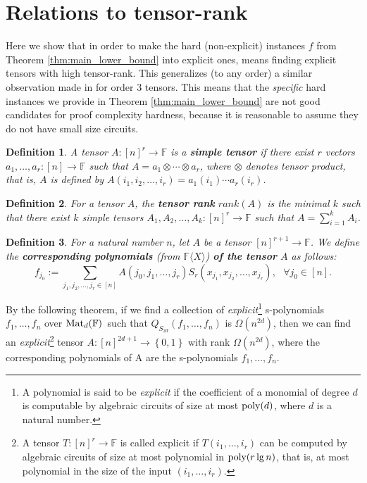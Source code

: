 \documentclass[12pt,reqno]{article}
\newtheorem{definition}{Definition}
\newcommand\F{\ensuremath{\mathbb F}}
\newcommand{\poly}{\hbox{poly}}
\newcommand{\matd}{{\ensuremath{{\rm Mat}_d(\F)}}}
\newcommand{\freea}{\ensuremath{\F\langle X\rangle}}
\newcommand{\set}[1]{\left\{#1\right\}}
\newcommand{\nx}[1]{#1_1,\ldots,#1_{n}}
\begin{document}
\section{Relations to tensor-rank }
Here we show that in order to make the hard (non-explicit) instances
$f$ from Theorem \ref{thm:main_lower_bound} into explicit ones, means finding explicit tensors with high tensor-rank.
This generalizes (to any order) a similar observation made in \cite{Hru11} for order 3 tensors. This means that the\textit{ specific} hard instances we provide in Theorem \ref{thm:main_lower_bound} are not good candidates for proof complexity hardness, because it is reasonable to assume they do not have small size circuits.


\begin{definition}
A  tensor $A : [n]^r\to \F$ is a \textbf{\textit{simple tensor }}if there exist $r$ vectors $a_1,\ldots,a_r:[n]\to \F$ such that $A=a_1\otimes\cdots\otimes a_r$, where $\otimes $ denotes tensor product, that is, $A$ is defined by $A(i_1,i_2,\ldots, i_r)=
a_1(i_1)\cdots a_r(i_r)$.
\end{definition}
\begin{definition}
For  a tensor $A$, the \textbf{tensor rank} $rank(A)$ is the minimal $k$ such that there exist $k$ simple tensors $A_1,A_2,\ldots, A_k:[n]^r\to \F$  such that $A =\sum_{i=1}^kA_i $.
\end{definition}

\begin{definition}
For a natural number $n$, let $A$ be a tensor $[n]^{r+1}\rightarrow \F$. We define the \textbf{corresponding polynomials} (from \freea ) \textbf{\textit{of the tensor}} $A$ as follows:
$$f_{j_0}:=\sum_{j_1,j_2,\ldots,j_{r}\in [n]}A(j_0,j_1,\ldots, j_{r})S_{r}(x_{j_1},x_{j_2},\ldots,x_{j_{r}}),~~~\forall j_0\in[n].$$
\end{definition}

By the following theorem, if we find  a  collection  of \emph{explicit}\footnote{A polynomial is said to be \emph{explicit} if the coefficient of a monomial of degree $d$ is computable by algebraic circuits of size at most $\poly(d)$, where $d$ is a natural number.} s-polynomials  $\nx{f}$ over \matd\ such that $Q_{S_{2d}}(\nx{f})$ is $\Omega(n^{2d})$, then we can find an \textit{explicit}\footnote{A tensor $T:[n]^r\rightarrow \F$ is called explicit if $T(i_1 ,\ldots, i_r)$ can be computed by algebraic circuits of size at most polynomial in $\poly(r \lg n)$, that is, at most polynomial in the size of the input $(i_1 ,\ldots, i_r)$.} tensor $A:[n]^{2d+1}\rightarrow \set{0,1}$ with rank $\Omega(n^{2d})$, where the corresponding polynomials of A are the s-polynomials $\nx{f}$.
\end{document}

